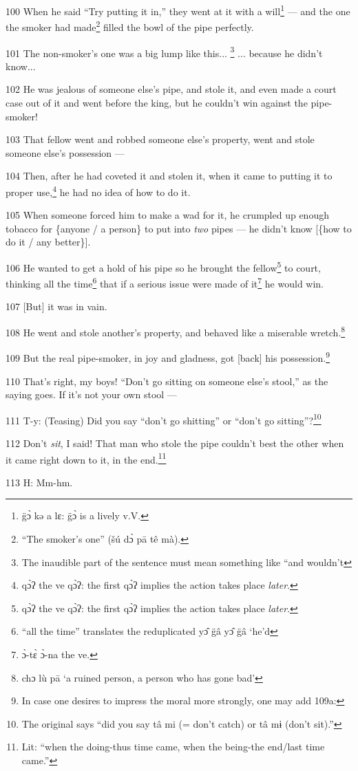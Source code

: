 100 When he said ``Try putting it in,'' they went at it with a will\footnote{g̈ɔ̀ kə a lɛ: g̈ɔ̀ is a lively v.V.} --- and
the one the smoker had made\footnote{``The smoker's one'' (šú dɔ̀ pā tê mà).} filled the bowl of the pipe perfectly.

101 The non-smoker's one was a big lump like this... \footnote{The inaudible part of the sentence must mean something like ``and wouldn't} ... because he didn't
know...

102 He was jealous of someone else's pipe, and stole it, and even made a court
case out of it and went before the king, but he couldn't win against the pipe-smoker!

103 That fellow went and robbed someone else's property, went and stole someone
else's possession ---

104 Then, after he had coveted it and stolen it, when it came to putting it to
proper use,\footnote{qɔ̀ʔ the ve qɔ̀ʔ: the first qɔ̀ʔ implies the action takes place \textit{later}.} he had no idea of how to do it.

105 When someone forced him to make a wad for it, he crumpled up enough tobacco
for \{anyone / a person\} to put into \textit{two }pipes --- he didn't know [\{how
to do it / any better\}].

106 He wanted to get a hold of his pipe so he brought the fellow\footnote{qɔ̀ʔ the ve qɔ̀ʔ: the first qɔ̀ʔ implies the action takes place \textit{later}.} to court,
thinking all the time\footnote{``all the time'' translates the reduplicated yɔ̂ g̈â yɔ̂ g̈â `he'd} that if a serious issue were made of it\footnote{ɔ̀-tɛ̀ ɔ̀-na the ve.} he would
win.

107 [But] it was in vain.

108 He went and stole another's property, and behaved like a miserable wretch.\footnote{chɔ lù pā `a ruined person, a person who has gone bad'}

109 But the real pipe-smoker, in joy and gladness, got [back] his possession.\footnote{In case one desires to impress the moral more strongly, one may add 109a:}

110 That's right, my boys! ``Don't go sitting on someone else's stool,'' as the
saying goes. If it's not your own stool ---

111 T-y: (Teasing) Did you say ``don't go shitting'' or ``don't go sitting''?\footnote{The original says ``did you say tâ mi (= don't catch) or tâ mɨ (don't sit).''}

112 Don't \textit{sit}, I said! That man who stole the pipe couldn't best the other
when it came right down to it, in the end.\footnote{Lit: ``when the doing-thus time came, when the being-the end/last time came.''}

113 H: Mm-hm.

